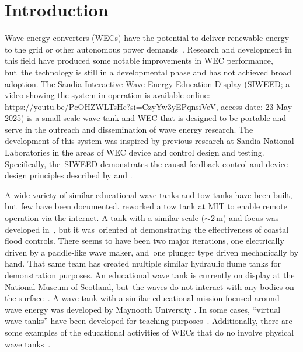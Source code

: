 \documentclass[hardware,article,submit,pdftex,moreauthors]{Definitions/mdpi}
\begin{document}
\section{Introduction}
Wave energy converters (WECs) have the potential to deliver renewable energy to the grid or other autonomous power demands~\cite{Hagerman:2011aa,Clement2002,FALCAO2010899}.
Research and development in this field have produced some notable improvements in WEC performance, but~the technology is still in a developmental phase and has not achieved broad adoption.
The Sandia Interactive Wave Energy Education Display (SIWEED; a video showing the system in operation is available online: %
 \url{https://youtu.be/PcOHZWLTsHc?si=CzyYw3yEPqnsiVeV}, access date: 23 May 2025) is a small-scale wave tank and WEC that is designed to be portable and serve in the outreach and dissemination of wave energy research.
The development of this system was inspired by previous research at Sandia National Laboratories in the areas of WEC device and control design and testing.
Specifically, the~SIWEED demonstrates the causal feedback control and device design principles described by \citet{Bacelli2020} and \citet{Coe:2021aa}.

A wide variety of similar educational wave tanks and tow tanks have been built, but~few have been documented.
\citet{unger2006creating} reworked a tow tank at MIT to enable remote operation via the internet.
A tank with a similar scale ($\sim$2\,m) and focus was developed in~\cite{Trust2015}, but it was~oriented at demonstrating the effectiveness of coastal flood controls.
There seems to have been two major iterations, one electrically driven by a paddle-like wave maker, and~one plunger type driven mechanically by hand. 
That same team has created multiple similar hydraulic flume tanks for demonstration purposes.
An educational wave tank is currently on display at the National Museum of Scotland, but~the waves do not interact with any bodies on the surface~\cite{Ivan2016}.
A wave tank with a similar educational mission focused around wave energy was developed by Maynooth University \cite{Maynooth}.
In some cases, ``virtual wave tanks'' have been developed for teaching purposes~\cite{Ryu:2003aa}.
Additionally, there are some examples of the educational activities of WECs that do no involve physical wave tanks~\cite{Huynh:2016aa,Satriawan:2022aa,Satriawan:2024aa}.
\end{document}
